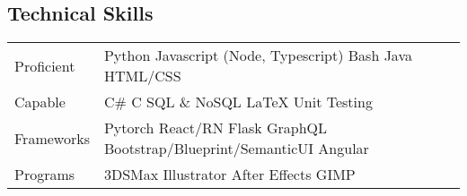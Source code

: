 \subsection*{Technical Skills}
\begin{indentsection}{\parindent}
\begin{tabular}{ m{2.2cm} | l }
 Proficient &
    \quad Python \quad Javascript (Node, Typescript) \quad Bash \quad Java \quad HTML/CSS\\
 Capable &
 	\quad C\# \quad C \quad SQL \& NoSQL \quad LaTeX \quad Unit Testing \\
 Frameworks&
 	\quad Pytorch \quad React/RN \quad Flask \quad GraphQL \quad Bootstrap/Blueprint/SemanticUI \quad Angular \\
 Programs &
 	\quad 3DSMax \quad Illustrator \quad After Effects \quad GIMP
\end{tabular}
\end{indentsection}